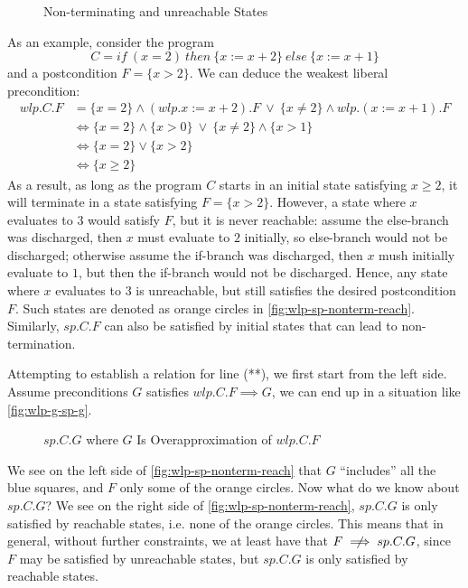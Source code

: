 \begin{figure}[ht]
	\centering
	
	\caption{Non-terminating and unreachable States}
	\label{fig:wlp-sp-nonterm-reach}
\end{figure}

As an example, consider the program 
$$C=if\ (x=2)\ then\ \{x:=x+2\}\ else\ \{x:=x+1\}$$
and a postcondition $F=\{x>2\}$.
We can deduce the weakest liberal precondition: 
\begin{align*}
	wlp.C.F &= \{x=2\}\wedge (wlp.x:=x+2).F\ \vee\ \{x\neq 2\} \wedge wlp.(x:=x+1).F\\
	&\Leftrightarrow\{x=2\}\wedge \{x>0\}\  \vee \ \{x\neq 2\}\wedge\{x>1\}\\
	&\Leftrightarrow\{x=2\} \vee \{x>2\}\\ 
	&\Leftrightarrow \{x\geq 2\}
\end{align*}
As a result, as long as the program $C$ starts in an initial state satisfying $x\geq 2$, it will terminate in a state satisfying $F=\{x>2\}$. 
However, a state where $x$ evaluates to $3$ would satisfy $F$, but it is never reachable: assume the else-branch was discharged, then $x$ must evaluate to $2$ initially, so else-branch would not be discharged; otherwise assume the if-branch was discharged, then $x$ mush initially evaluate to $1$, but then the if-branch would not be discharged. 
Hence, any state where $x$ evaluates to $3$ is unreachable, but still satisfies the desired postcondition $F$. 
Such states are denoted as orange circles in \autoref{fig:wlp-sp-nonterm-reach}. 
Similarly, $sp.C.F$ can also be satisfied by initial states that can lead to non-termination.

Attempting to establish a relation for line (**), we first start from the left side. 
Assume preconditions $G$ satisfies $wlp.C.F\implies G$, we can end up in a situation like \autoref{fig:wlp-g-sp-g}. 

\begin{figure}[ht]
	\centering
	
	\caption{$sp.C.G$ where $G$ Is Overapproximation of $wlp.C.F$}
	\label{fig:wlp-g-sp-g}
\end{figure}

\newcommand{\nimplies}{\rlap{\(\quad\not\)}\implies} %
We see on the left side of \autoref{fig:wlp-sp-nonterm-reach} that $G$ ``includes'' all the blue squares, and $F$ only some of the orange circles. 
Now what do we know about $sp.C.G$? 
We see on the right side of \autoref{fig:wlp-sp-nonterm-reach}, $sp.C.G$ is only satisfied by reachable states, i.e. none of the orange circles. 
This means that in general, without further constraints, we at least have that $F\nimplies sp.C.G$, since $F$ may be satisfied by unreachable states, but $sp.C.G$ is only satisfied by reachable states. 

